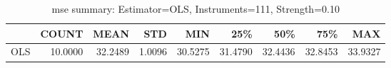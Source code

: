 \begin{table}[ht]
\centering
\caption{mse summary: Estimator=OLS, Instruments=111, Strength=0.10}
\begin{tabular}{lrrrrrrrr}
\toprule
 & COUNT & MEAN & STD & MIN & 25\% & 50\% & 75\% & MAX \\
\midrule
OLS & 10.0000 & 32.2489 & 1.0096 & 30.5275 & 31.4790 & 32.4436 & 32.8453 & 33.9327 \\
\bottomrule
\end{tabular}
\end{table}
